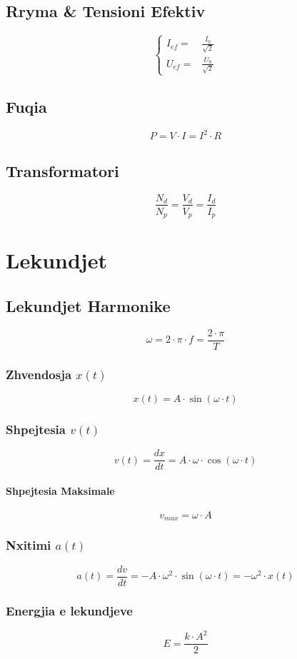 \documentclass[a4paper, twocolumn]{article}
\begin{document}
	\subsection{Rryma \& Tensioni Efektiv}
\[
\left\{
	\begin{matrix}
		I_{ef} =&  \frac{I_0}{\sqrt{2}} \\
		U_{ef} =& \frac{U_0}{\sqrt{2}}
	\end{matrix}
\right.
\]
\subsection{Fuqia}
\[
P=V\cdot I=I^2 \cdot R
\]
\subsection{Transformatori}
\[
\frac{N_d}{N_p}=\frac{V_d}{V_p}=\frac{I_d}{I_p}
\]
\section{Lekundjet}
\subsection{Lekundjet Harmonike}
\[
\omega = 2\cdot \pi \cdot f= \frac{2\cdot \pi}{T}
\]
\subsubsection{Zhvendosja $x\left( t \right) $ }
\[
	x\left( t \right) = A \cdot \sin\left( \omega \cdot t \right)
\]
\subsubsection{Shpejtesia $v\left( t \right) $}
\[
	v\left( t \right) =\dfrac{d x}{d t}= A \cdot \omega\cdot \cos\left( \omega \cdot t \right)
\]
\paragraph{Shpejtesia Maksimale}
\[
	v_{max}=\omega \cdot A
\]
\subsubsection{Nxitimi $a\left( t \right) $}
\[
	a\left( t \right) = \dfrac{dv}{dt} = -A \cdot  \omega^2 \cdot \sin\left( \omega \cdot t \right) = -\omega^2 \cdot x\left( t \right)
\]
\subsubsection{Energjia e lekundjeve}
\[
	E=\frac{k\cdot A^2}{2}
\]
\end{document}
